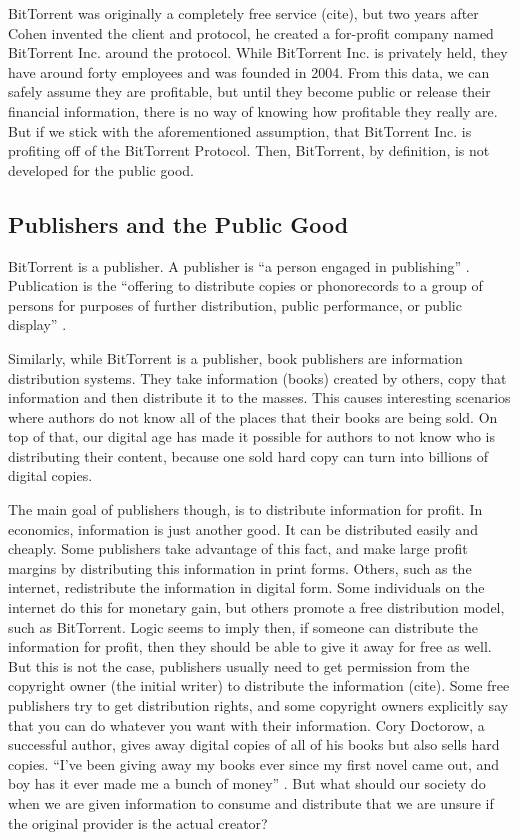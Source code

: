 \documentclass[11pt]{article}
\begin{document}
BitTorrent was originally a completely free service (cite), but two years after Cohen invented the client and protocol, he created a for-profit company named BitTorrent Inc. around the protocol. While BitTorrent Inc. is privately held, they have around forty employees and was founded in 2004. From this data, we can safely assume they are profitable, but until they become public or release their financial information, there is no way of knowing how profitable they really are. But if we stick with the aforementioned assumption, that BitTorrent Inc. is profiting off of the BitTorrent Protocol. Then, BitTorrent, by definition, is not developed for the public good.

\subsection{Publishers and the Public Good}

BitTorrent is a publisher. A publisher is ``a person engaged in publishing'' \cite{publisher}. Publication is the ``offering to distribute copies or phonorecords to a group of persons for purposes of further distribution, public performance, or public display'' \cite{publish}.

Similarly, while BitTorrent is a publisher, book publishers are information distribution systems. They take information (books) created by others, copy that information and then distribute it to the masses. This causes interesting scenarios where authors do not know all of the places that their books are being sold. On top of that, our digital age has made it possible for authors to not know who is distributing their content, because one sold hard copy can turn into billions of digital copies.

The main goal of publishers though, is to distribute information for profit. In economics, information is just another good. It can be distributed easily and cheaply. Some publishers take advantage of this fact, and make large profit margins\cite{PSO} by distributing this information in print forms. Others, such as the internet, redistribute the information in digital form. Some individuals on the internet do this for monetary gain, but others promote a free distribution model, such as BitTorrent. Logic seems to imply then, if someone can distribute the information for profit, then they should be able to give it away for free as well. But this is not the case, publishers usually need to get permission from the copyright owner (the initial writer) to distribute the information (cite). Some free publishers try to get distribution rights, and some copyright owners explicitly say that you can do whatever you want with their information. Cory Doctorow, a successful author, gives away digital copies of all of his books but also sells hard copies. ``I've been giving away my books ever since my first novel came out, and boy has it ever made me a bunch of money'' \cite{doctorow}. But what should our society do when we are given information to consume and distribute that we are unsure if the original provider is the actual creator?
\end{document}
